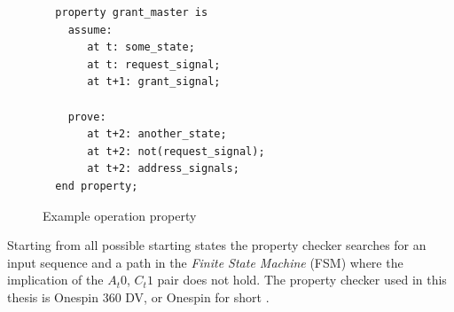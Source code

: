 \begin{figure}[hbt]
\begin{lstlisting}
  property grant_master is
    assume:
       at t: some_state;
       at t: request_signal;
       at t+1: grant_signal;

    prove:
       at t+2: another_state;
       at t+2: not(request_signal);
       at t+2: address_signals;
  end property; 
\end{lstlisting}
\label{fig:exop}
\caption{Example operation property}
\end{figure}

Starting from all possible starting states the property checker searches for an input sequence and a path in the \textit{Finite State Machine} (FSM) where the implication of the $A_t0$, $C_t1$ pair does not hold. The property checker used in this thesis is Onespin 360 DV, or Onespin for short \cite{onespin}. 

